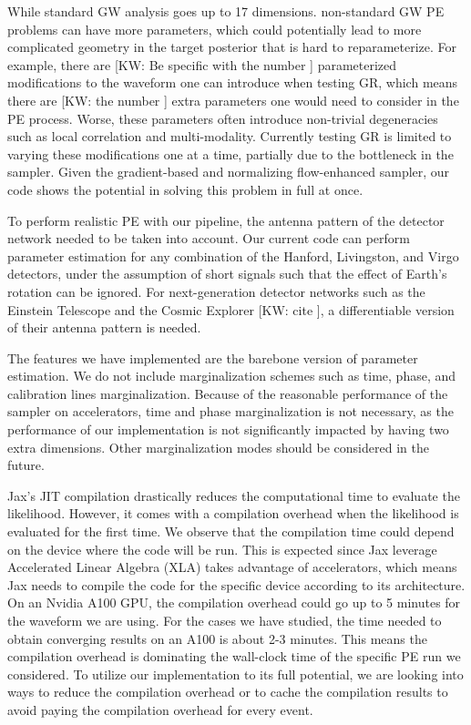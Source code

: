 \documentclass[twocolumn]{aastex631}
\newcommand{\kw}[1]{{\color{rb4}[KW: #1 ]}}
\begin{document}
While standard GW analysis goes up to 17 dimensions. non-standard GW PE problems
can have more parameters, which could potentially lead to more complicated
geometry in the target posterior that is hard to reparameterize. For example,
there are \kw{Be specific with the number} parameterized modifications to the
waveform one can introduce when testing GR, which means there are \kw{the number}
extra parameters one would need to consider in the PE process. Worse, these
parameters often introduce non-trivial degeneracies such as local correlation
and multi-modality. Currently testing GR is limited to varying these
modifications one at a time, partially due to the bottleneck in the sampler. Given
the gradient-based and normalizing flow-enhanced sampler, our code shows
the potential in solving this problem in full at once.



To perform realistic PE with our pipeline, the antenna pattern of the
detector network needed to be taken into account. Our current code can perform
parameter estimation for any combination of the Hanford, Livingston, and Virgo
detectors, under the assumption of short signals such that the effect of Earth's
rotation can be ignored. For next-generation detector networks such as the
Einstein Telescope and the Cosmic Explorer \kw{cite}, a differentiable version
of their antenna pattern is needed.

The features we have implemented are the barebone version of parameter
estimation. We do not include marginalization schemes such as time, phase, and
calibration lines marginalization. Because of the reasonable performance of the sampler on
accelerators, time and phase marginalization is not necessary, as the
performance of our implementation is not significantly impacted by having two
extra dimensions. Other marginalization modes should be considered in the future.

Jax's JIT compilation drastically reduces the computational time to evaluate the
likelihood. However, it comes with a compilation overhead when the likelihood is
evaluated for the first time. We observe that the compilation time could depend
on the device where the code will be run. This is expected since Jax leverage
Accelerated Linear Algebra (XLA) takes advantage of accelerators, which means
Jax needs to compile the code for the specific device according to its
architecture. On an Nvidia A100 GPU, the compilation overhead could go up to 5
minutes for the waveform we are using. For the cases we have studied, the time
needed to obtain converging results on an A100 is about 2-3 minutes. This means
the compilation overhead is dominating the wall-clock time of the specific PE
run we considered. To utilize our implementation to its full potential, we are
looking into ways to reduce the compilation overhead or to cache the
compilation results to avoid paying the compilation overhead for every event.
\end{document}
